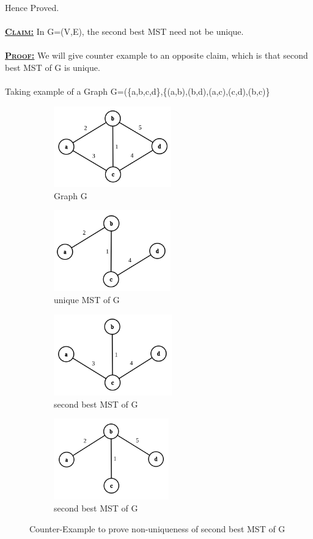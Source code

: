\documentclass[a4 paper]{article}
\begin{document}
Hence Proved.\\\\
\textbf{\underline{\textsc{Claim:}}} In G=(V,E), the second best MST need not be unique.\\\\
\textbf{\underline{\textsc{Proof:}}} We will give counter example to an opposite claim, which is that second best MST of G is unique.\\\\
Taking example of a Graph G=(\{a,b,c,d\},\{(a,b),(b,d),(a,c),(c,d),(b,c)\}\\
\begin{figure}[h]
\begin{subfigure}{0.5\textwidth}
\includegraphics[width=0.6\linewidth, height=3.5cm,left]{7.png} 
\caption{Graph G}
\label{fig:subim1}
\end{subfigure}
\begin{subfigure}{0.5\textwidth}
\includegraphics[width=0.6\linewidth, height=3.5cm,right]{6.png}
\caption{unique MST of G}
\label{fig:subim2}
\end{subfigure}
\begin{subfigure}{0.5\textwidth}
\includegraphics[width=0.6\linewidth, height=3.5cm,left]{5.png} 
\caption{second best MST of G}
\label{fig:subim3}
\end{subfigure}
\begin{subfigure}{0.5\textwidth}
\includegraphics[width=0.6\linewidth, height=3.5cm,right]{4.png}
\caption{second best MST of G}
\label{fig:subim4}
\end{subfigure}
\caption{Counter-Example to prove non-uniqueness of second best MST of G}
\label{fig:image2}
\end{figure}\\\\
\end{document}
